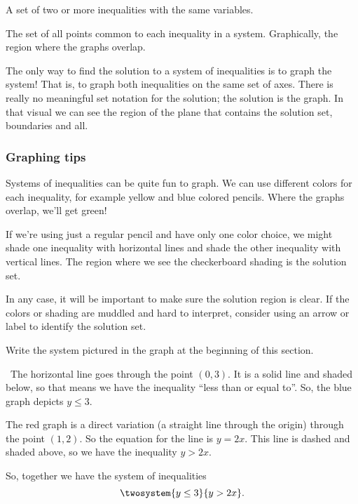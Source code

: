 \begin{boxeddef}
A set of two or more inequalities with the same variables.
\end{boxeddef}

\begin{boxeddef}
The set of all points common to each inequality in a system. Graphically, the region where the graphs overlap.
\end{boxeddef}

The only way to find the solution to a system of inequalities is to graph the system! That is, to graph both inequalities on the same set of axes. There is really no meaningful set notation for the solution; the solution is the graph. In that visual we can see the region of the plane that contains the solution set, boundaries and all.

\subsubsection{Graphing tips}

Systems of inequalities can be quite fun to graph. We can use different colors for each inequality, for example yellow and blue colored pencils. Where the graphs overlap, we'll get green!

If we're using just a regular pencil and have only one color choice, we might shade one inequality with horizontal lines and shade the other inequality with vertical lines. The region where we see the checkerboard shading is the solution set.

In any case, it will be important to make sure the solution region is clear. If the colors or shading are muddled and hard to interpret, consider using an arrow or label to identify the solution set.

\begin{boxedex}
Write the system pictured in the graph at the beginning of this section.

\exsoln\ The horizontal line goes through the point $(0,3)$. It is a solid line and shaded below, so that means we have the inequality ``less than or equal to''. So, the blue graph depicts $y \leq 3$.

The red graph is a direct variation (a straight line through the origin) through the point $(1,2)$. So the equation for the line is $y=2x$. This line is dashed and shaded above, so we have the inequality $y > 2x$.

So, together we have the system of inequalities \[\twosystem{y\leq3}{y>2x}.\]
\end{boxedex}

